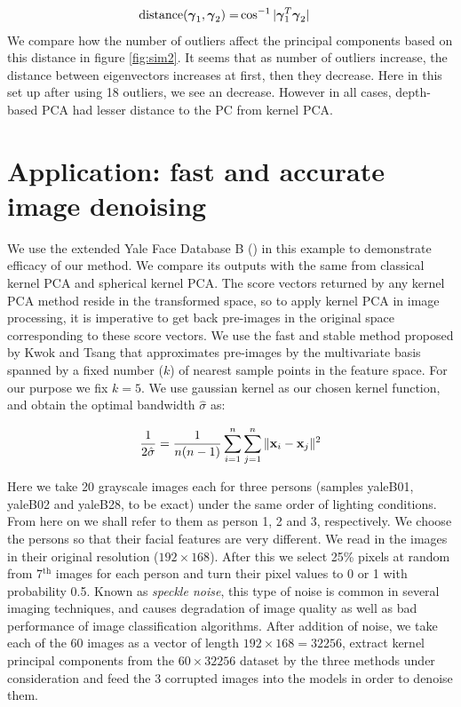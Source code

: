 \documentclass[10pt, conference, compsocconf]{IEEEtran}
\begin{document}
\begin{align*}
\text{distance}({\boldsymbol{\gamma}}_1, {\boldsymbol{\gamma}}_2) =& \cos^{-1} | {\boldsymbol{\gamma}}_1^T {\boldsymbol{\gamma}}_2 |
\end{align*}
We compare how the number of outliers affect the principal components based on this distance in figure \ref{fig:sim2}. It seems that as number of outliers increase, the distance between eigenvectors increases at first, then they decrease. Here in this set up after using 18 outliers, we see an decrease. However in all cases, depth-based PCA had lesser distance to the PC from kernel PCA.

\section{Application: fast and accurate image denoising}\label{section:sec5}

We use the extended Yale Face Database B (\cite{GeBeKr01,KcLee05}) in this  example to demonstrate efficacy of our method. We compare its outputs with the same from classical kernel PCA and spherical kernel PCA. The score vectors returned by any kernel PCA method reside in the transformed space, so to apply kernel PCA in image processing, it is imperative to get back pre-images in the original space corresponding to these score vectors. We use the fast and stable method proposed by Kwok and Tsang that approximates pre-images by the multivariate basis spanned by a fixed number ($k$) of nearest sample points in the feature space\cite{KwokTsang03}. For our purpose we fix $k=5$. We use gaussian kernel as our chosen kernel function, and obtain the optimal bandwidth $\hat\sigma$ as:

\begin{equation}
\frac{1}{2\hat\sigma} = \frac{1}{n(n-1)} \sum_{i=1}^n \sum_{j=1}^n \| {\bf{x}}_i - {\bf{x}}_j \|^2
\end{equation}

Here we take 20 grayscale images each for three persons (samples yaleB01, yaleB02 and yaleB28, to be exact) under the same order of lighting conditions. From here on we shall refer to them as person 1, 2 and 3, respectively. We choose the persons so that their facial features are very different. We read in the images in their original resolution ($192 \times 168$). After this we select 25\% pixels at random from 7$^\text{th}$ images for each person and turn their pixel values to 0 or 1 with probability 0.5. Known as \textit{speckle noise}, this type of noise is common in several imaging techniques, and causes degradation of image quality as well as bad performance of image classification algorithms\cite{Qiuetal04}. After addition of noise, we take each of the 60 images as a vector of length $192\times 168 = 32256$, extract kernel principal components from the $60 \times 32256$ dataset by the three methods under consideration and feed the 3 corrupted images into the models in order to denoise them.
\end{document}

